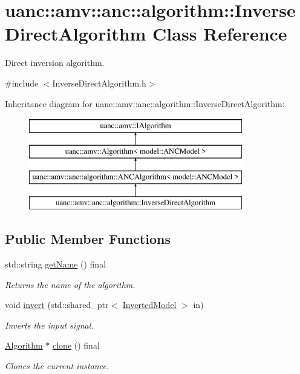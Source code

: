 \hypertarget{classuanc_1_1amv_1_1anc_1_1algorithm_1_1_inverse_direct_algorithm}{}\section{uanc\+:\+:amv\+:\+:anc\+:\+:algorithm\+:\+:Inverse\+Direct\+Algorithm Class Reference}
\label{classuanc_1_1amv_1_1anc_1_1algorithm_1_1_inverse_direct_algorithm}


Direct inversion algorithm.  




{\ttfamily \#include $<$Inverse\+Direct\+Algorithm.\+h$>$}

Inheritance diagram for uanc\+:\+:amv\+:\+:anc\+:\+:algorithm\+:\+:Inverse\+Direct\+Algorithm\+:\begin{figure}[H]
\begin{center}
\leavevmode
\includegraphics[height=4.000000cm]{classuanc_1_1amv_1_1anc_1_1algorithm_1_1_inverse_direct_algorithm}
\end{center}
\end{figure}
\subsection*{Public Member Functions}
\begin{DoxyCompactItemize}
\item 
std\+::string \hyperlink{classuanc_1_1amv_1_1anc_1_1algorithm_1_1_inverse_direct_algorithm_af7933bf4a0ad32c58688d8d74c6f2487}{get\+Name} () final
\begin{DoxyCompactList}\small\item\em Returns the name of the algorithm. \end{DoxyCompactList}\item 
void \hyperlink{classuanc_1_1amv_1_1anc_1_1algorithm_1_1_inverse_direct_algorithm_a4bd1bdcd128aee1f608be51660528954}{invert} (std\+::shared\+\_\+ptr$<$ \hyperlink{classuanc_1_1amv_1_1_inverted_model}{Inverted\+Model} $>$ in)
\begin{DoxyCompactList}\small\item\em Inverts the input signal. \end{DoxyCompactList}\item 
\hyperlink{classuanc_1_1amv_1_1_algorithm}{Algorithm} $\ast$ \hyperlink{classuanc_1_1amv_1_1anc_1_1algorithm_1_1_inverse_direct_algorithm_adce538c00ba00237ba29d725abaae764}{clone} () final
\begin{DoxyCompactList}\small\item\em Clones the current instance. \end{DoxyCompactList}\end{DoxyCompactItemize}
